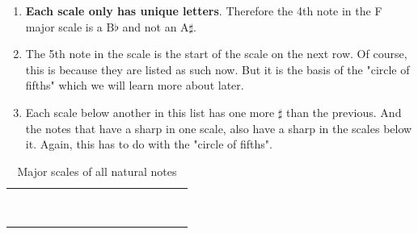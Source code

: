 \begin{enumerate}
	\item \textbf{Each scale only has unique letters}. Therefore the 4th note in the F major scale is a B$\flat$ and not an A$\sharp$.
	\item The 5th note in the scale is the start of the scale on the next row. Of course, this is because they are listed as such now. But it is the basis of the "circle of fifths" which we will learn more about later.
	\item Each scale below another in this list has one more $\sharp$ than the previous. And the notes that have a sharp in one scale, also have a sharp in the scales below it. Again, this has to do with the "circle of fifths".
\end{enumerate}

\begin{table}[h]
	\centering
	\begin{NiceTabular}{*{16}{P{0.05mm}}}
		\Block{}{} &  & &  & &  & &  & &  & &  & &  & & \Block{}{} \\
		 & &  & &  & &  & &  & &  & &  & &  & \\
		 & &  & &  & &  & &  & &  & &  & &  & \\
		 & &  & &  & &  & &  & &  & &  & &  & \\
		 & &  & &  & &  & &  & &  & &  & &  & \\
		 & &  & &  & &  & &  & &  & &  & &  & \\
		 & &  & &  & &  & &  & &  & &  & &  & \\
		 & &  & &  & &  & &  & &  & &  & &  & \\
		 & &  & &  & &  & &  & &  & &  & &  & 
	\end{NiceTabular}
	\caption{Major scales of all natural notes}
	\label{tab:guitar_natural_note_major_scale}
\end{table}

